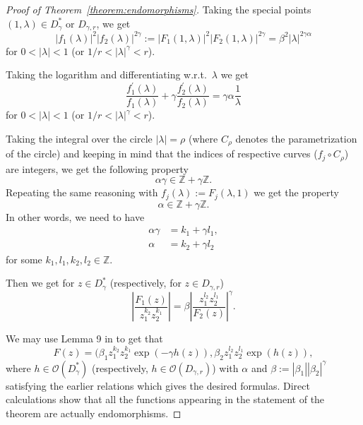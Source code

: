 \documentclass[a4paper,12pt]{amsart}
\theoremstyle{definition}
\begin{document}
\begin{proof}[Proof of Theorem~\ref{theorem:endomorphisms}]
Taking the special points $(1,\lambda)\in D_{\gamma}^*$ or $D_{\gamma,r}$, we get
\begin{equation}
    |f_1(\lambda)|^2|f_2(\lambda)|^{2\gamma}:=|F_1(1,\lambda)|^2|F_2(1,\lambda)|^{2\gamma}=\beta^2 |\lambda|^{2\gamma\alpha}
\end{equation}
for $0<|\lambda|<1$ (or $1/r<|\lambda|^{\gamma}<r$).

Taking the logarithm and differentiating w.r.t.\  $\lambda$ we get
\begin{equation}
\frac{f_1^{\prime}(\lambda)}{f_1(\lambda)}+\gamma \frac{f_2^{\prime}(\lambda)}{f_2(\lambda)}=\gamma\alpha\frac{1}{\lambda}
\end{equation}
for $0<|\lambda|<1$ (or $1/r<|\lambda|^{\gamma}<r$).

Taking the integral over the circle $|\lambda|=\rho$ (where $C_{\rho}$ denotes the parametrization of the circle) and keeping in mind that the indices of respective curves ($f_j\circ C_{\rho}$) are integers, we get the following property
\begin{equation}
    \alpha\gamma\in\mathbb Z+\gamma\mathbb Z.
\end{equation}
Repeating the same reasoning with $f_j(\lambda):=F_j(\lambda,1)$ we get the property
\begin{equation}
    \alpha\in\mathbb Z+\gamma\mathbb Z.
\end{equation}
In other words, we need to have
\begin{align}
  \alpha\gamma&=k_1+\gamma l_1,\\
  \alpha&=k_2+\gamma l_2
\end{align}
for some $k_1,l_1,k_2,l_2\in\mathbb Z$.

Then we get for $z\in D_{\gamma}^*$ (respectively, for $z\in D_{\gamma,r}$)
\begin{equation}
 \left|\frac{F_1(z)}{z_1^{k_2}z_2^{k_1}}\right|=\beta\left|\frac{z_1^{l_2}z_2^{l_1}}{F_2(z)}\right|^{\gamma}.
\end{equation}

We may use Lemma 9 in \cite{05208635} to get that 
\begin{equation}
    F(z)=(\beta_1 z_1^{k_2}z_2^{k_1}\exp(-\gamma h(z)),\beta_2 z_1^{l_2}z_2^{l_1}\exp(h(z)),
    \end{equation}
    where $h\in\mathcal O(D_{\gamma}^*)$ (respectively,  $h\in\mathcal O(D_{\gamma,r})$) with $\alpha$ and $\beta:=|\beta_1||\beta_2|^{\gamma}$ satisfying the earlier relations which gives the desired formulas.
    Direct calculations show that all the functions appearing in the statement of the theorem are actually endomorphisms.   
\end{proof}
\end{document}
